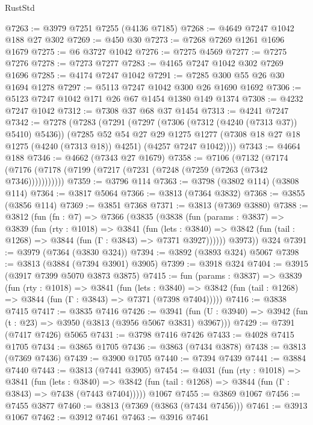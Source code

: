 \begin{lexlean}{RustStd}
\begin{coremodule}
{\begin{coremodule}
{{{{{{{{{{{{{{{{{{{{{{{{{{{{{{{{{{{@7263 := @3979 @7251 @7255 (@4136 @7185)
@7268 := @4649 @7247 @1042 @188 @27 @302
@7269 := @450 @30
@7273 := @7268 @7269 @1261 @1696 @1679
@7275 := @6 @3727 @1042
@7276 := @7275 @4569
@7277 := @7275 @7276
@7278 := @7273 @7277
@7283 := @4165 @7247 @1042 @302 @7269 @1696
@7285 := @4174 @7247 @1042
@7291 := @7285 @300 @55 @26 @30 @1694 @1278
@7297 := @5113 @7247 @1042 @300 @26 @1690 @1692
@7306 := @5123 @7247 @1042 @171 @26 @67 @1454 @1380 @149 @1374
@7308 := @4232 @7247 @1042
@7312 := @7308 @37 @68 @37 @1454
@7313 := @4241 @7247
@7342 := @7278
    (@7283
      (@7291
        (@7297 (@7306 (@7312 (@4240 (@7313 @37)) @5410) @5436))
        (@7285
          @52
          @54
          @27
          @29
          @1275
          @1277
          (@7308 @18 @27 @18 @1275 (@4240 (@7313 @18)) @4251)
          (@4257 @7247 @1042))))
@7343 := @4664 @188
@7346 := @4662 (@7343 @27 @1679)
@7358 := @7106
    (@7132 (@7174 (@7176 (@7178 (@7199 (@7217 (@7231 (@7248 (@7259 (@7263 (@7342 @7346)))))))))))
@7359 := @3796 @114
@7363 := @3798 (@3802 @114) (@3808 @114)
@7364 := @3817 @5064
@7366 := @3813 (@7364 @3832)
@7368 := @3855 (@3856 @114)
@7369 := @3851 @7368
@7371 := @3813 (@7369 @3880)
@7388 := @3812
    (fun (fn : @7) =>
    @7366
      (@3835
        (@3838
          (fun (params : @3837) =>
          @3839
            (fun (rty : @1018) =>
            @3841
              (fun (lets : @3840) =>
              @3842 (fun (tail : @1268) => @3844 (fun (Γ : @3843) => @7371 @3927))))))
        @3973))
    @324
@7391 := @3979 (@7364 (@3830 @324))
@7394 := @3892 (@3893 @324) @5067
@7398 := @3813 (@3884 (@7394 @3901) @3905)
@7399 := @3918 @324
@7404 := @3915 (@3917 @7399 @5070 @3873 @3875)
@7415 := fun (params : @3837) =>
  @3839
    (fun (rty : @1018) =>
    @3841
      (fun (lets : @3840) =>
      @3842 (fun (tail : @1268) => @3844 (fun (Γ : @3843) => @7371 (@7398 @7404)))))
@7416 := @3838 @7415
@7417 := @3835 @7416
@7426 := @3941 (fun (U : @3940) => @3942 (fun (t : @23) => @3950 (@3813 (@3956 @5067 @3831) @3967)))
@7429 := @7391 (@7417 @7426) @5065
@7431 := @3798 @7416 @7426
@7433 := @4028 @7415 @1705
@7434 := @3865 @1705
@7436 := @3863 (@7434 @3878)
@7438 := @3813 (@7369 @7436)
@7439 := @3900 @1705
@7440 := @7394 @7439
@7441 := @3884 @7440
@7443 := @3813 (@7441 @3905)
@7454 := @4031
    (fun (rty : @1018) =>
    @3841
      (fun (lets : @3840) =>
      @3842 (fun (tail : @1268) => @3844 (fun (Γ : @3843) => @7438 (@7443 @7404)))))
    @1067
@7455 := @3869 @1067
@7456 := @7455 @3877
@7460 := @3813 (@7369 (@3863 (@7434 @7456)))
@7461 := @3913 @1067
@7462 := @3912 @7461
@7463 := @3916 @7461
}}}}}}}}}}}}}}}}}}}}}}}}}}}}}}}}}}}
\end{coremodule}}
\end{coremodule}
\end{lexlean}
